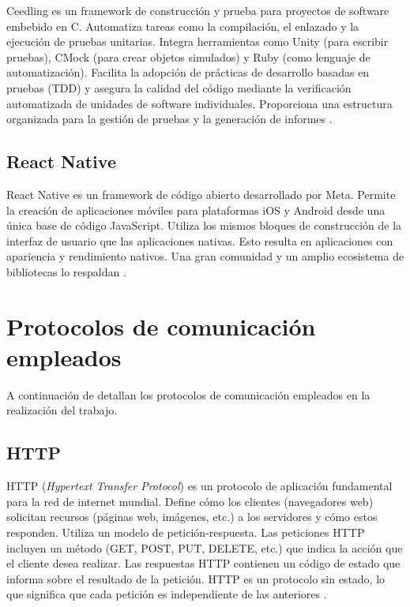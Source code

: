 Ceedling es un framework de construcción y prueba para proyectos de software embebido en C. Automatiza tareas como la compilación, el enlazado y la ejecución de pruebas unitarias. Integra herramientas como Unity (para escribir pruebas), CMock (para crear objetos simulados) y Ruby (como lenguaje de automatización). Facilita la adopción de prácticas de desarrollo basadas en pruebas (TDD) y asegura la calidad del código mediante la verificación automatizada de unidades de software individuales. Proporciona una estructura organizada para la gestión de pruebas y la generación de informes \cite{CEEDLING}.

\subsection{React Native}
React Native es un framework de código abierto desarrollado por Meta. Permite la creación de aplicaciones móviles para plataformas iOS y Android desde una única base de código JavaScript. Utiliza los mismos bloques de construcción de la interfaz de usuario que las aplicaciones nativas. Esto resulta en aplicaciones con apariencia y rendimiento nativos. Una gran comunidad y un amplio ecosistema de bibliotecas lo respaldan \cite{reactnative}.

\section{Protocolos de comunicación empleados}

A continuación de detallan los protocolos de comunicación empleados en la realización del trabajo.

\subsection{HTTP}
HTTP (\textit{Hypertext Transfer Protocol}) es un protocolo de aplicación fundamental para la red de internet mundial. Define cómo los clientes (navegadores web) solicitan recursos (páginas web, imágenes, etc.) a los servidores y cómo estos responden. Utiliza un modelo de petición-respuesta. Las peticiones HTTP incluyen un método (GET, POST, PUT, DELETE, etc.) que indica la acción que el cliente desea realizar. Las respuestas HTTP contienen un código de estado que informa sobre el resultado de la petición. HTTP es un protocolo sin estado, lo que significa que cada petición es independiente de las anteriores \cite{HTTP}.


